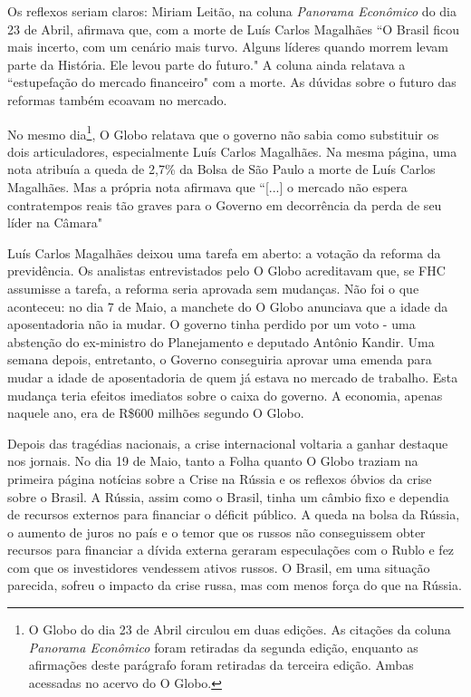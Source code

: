 \documentclass{article}
\begin{document}
Os reflexos seriam claros: Miriam Leitão, na coluna \textit{Panorama Econômico} do dia 23 de Abril, afirmava que, com a morte de Luís Carlos Magalhães ``O Brasil ficou mais incerto, com um cenário mais turvo. Alguns líderes quando morrem levam parte da História. Ele levou parte do futuro." A coluna ainda relatava a ``estupefação do mercado financeiro" com a morte. As dúvidas sobre o futuro das reformas também ecoavam no mercado.     
   
No mesmo dia\footnote{O Globo do dia 23 de Abril circulou em duas edições. As citações da coluna \textit{Panorama Econômico} foram retiradas da segunda edição, enquanto as afirmações deste parágrafo foram retiradas da terceira edição. Ambas acessadas no acervo do O Globo.}, O Globo relatava que o governo não sabia como substituir os dois articuladores, especialmente Luís Carlos Magalhães. Na mesma página, uma nota atribuía a queda de 2,7\% da Bolsa de São Paulo a morte de Luís Carlos Magalhães. Mas a própria nota afirmava que ``[...] o mercado não espera contratempos reais tão graves para o Governo em decorrência da perda de seu líder na Câmara" 

Luís Carlos Magalhães deixou uma tarefa em aberto: a votação da reforma da previdência. Os analistas entrevistados pelo O Globo acreditavam que, se FHC assumisse a tarefa, a reforma seria aprovada sem mudanças. Não foi o que aconteceu: no dia 7 de Maio, a manchete do O Globo anunciava que a idade da aposentadoria não ia mudar. O governo tinha perdido por um voto - uma abstenção do ex-ministro do Planejamento e deputado Antônio Kandir. Uma semana depois, entretanto, o Governo conseguiria aprovar uma emenda para mudar a idade de aposentadoria de quem já estava no mercado de trabalho. Esta mudança teria efeitos imediatos sobre o caixa do governo. A economia, apenas naquele ano, era de R\$600 milhões segundo O Globo. 

Depois das tragédias nacionais, a crise internacional voltaria a ganhar destaque nos jornais. No dia 19 de Maio, tanto a Folha quanto O Globo traziam na primeira página notícias sobre a Crise na Rússia e os reflexos óbvios da crise sobre o Brasil. A Rússia, assim como o Brasil, tinha um câmbio fixo e dependia de recursos externos para financiar o déficit público. A queda na bolsa da Rússia, o aumento de juros no país e o temor que os russos não conseguissem obter recursos para financiar a dívida externa geraram especulações com o Rublo e fez com que os investidores vendessem ativos russos. O Brasil, em uma situação parecida, sofreu o impacto da crise russa, mas com menos força do que na Rússia.
\end{document}
